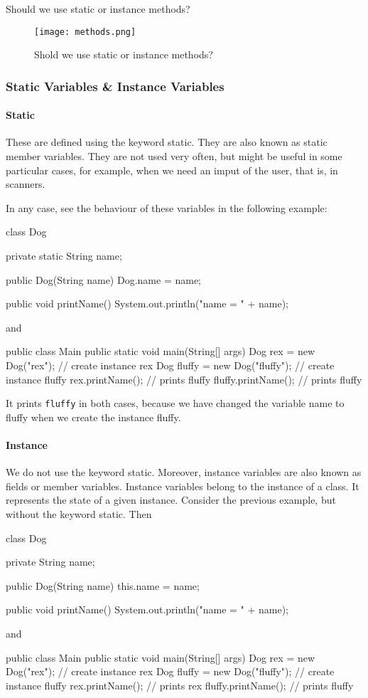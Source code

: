 Should we use static or instance methods? 
\begin{figure}[htb!]
	\texttt{[image: methods.png]}
    \caption{Shold we use static or instance methods?}
	\label{fig:methods}
\end{figure}


\subsubsection{Static Variables \& Instance Variables}

\paragraph{Static} These are defined using the keyword static. They are also known as static member
variables. They are not used very often, but might be useful in some particular cases, for 
example, when we need an imput of the user, that is, in scanners. 

In any case, see the behaviour of these variables in the following example: 
\begin{listing}{1}
class Dog { 
    private static String name; 

    public Dog(String name) {
        Dog.name = name;
    }

    public void printName() {
        System.out.println("name = " + name);
    }
}
\end{listing}
and 
\begin{listing}{1}
public class Main {
    public static void main(String[] args) {
        Dog rex = new Dog("rex"); // create instance rex
        Dog fluffy = new Dog("fluffy"); // create instance fluffy
        rex.printName(); // prints fluffy
        fluffy.printName(); // prints fluffy
    }
}
\end{listing}
It prints \verb|fluffy| in both cases, because we have changed the variable name to fluffy when we 
create the instance fluffy. 

\paragraph{Instance} We do not use the keyword static. Moreover, instance variables are also known 
as fields or member variables. Instance variables belong to the instance of a class. It represents 
the state of a given instance. Consider the previous example, but without the keyword static. Then 
\begin{listing}{1}
class Dog { 
    private String name; 

    public Dog(String name) {
        this.name = name;
    }

    public void printName() {
        System.out.println("name = " + name);
    }
}
\end{listing}
and 
\begin{listing}{1}
public class Main {
    public static void main(String[] args) {
        Dog rex = new Dog("rex"); // create instance rex
        Dog fluffy = new Dog("fluffy"); // create instance fluffy
        rex.printName(); // prints rex
        fluffy.printName(); // prints fluffy
    }
}
\end{listing}
